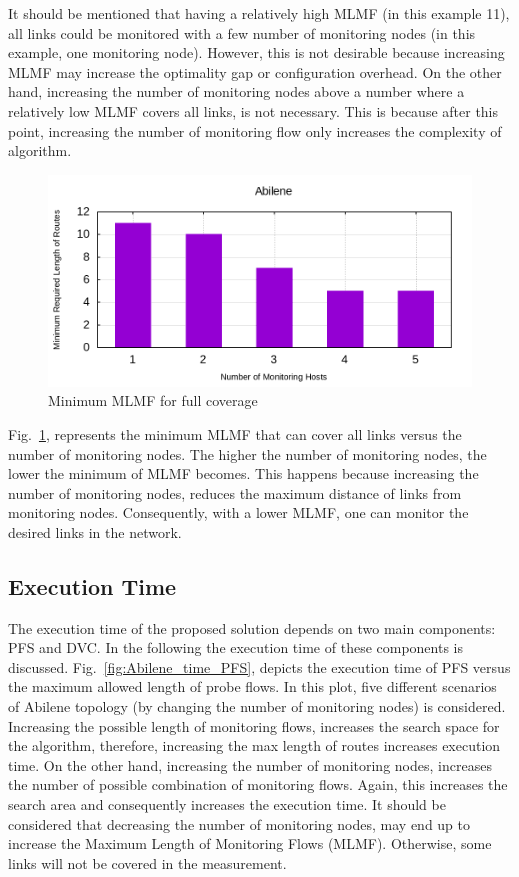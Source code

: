 \documentclass[10pt, journal, letterpaper]{IEEEtran}
\begin{document}
It should be mentioned that having a relatively high MLMF (in this example 11), all links could be monitored with a few number of monitoring nodes (in this example, one monitoring node). However, this is not desirable because increasing MLMF may increase the optimality gap or configuration overhead. On the other hand, increasing the number of monitoring nodes above a number where a relatively low MLMF covers all links, is not necessary. This is because after this point, increasing the number of monitoring flow only increases the complexity of algorithm. 
\begin{figure}
    \centering
    \includegraphics[width=0.8\columnwidth]{img/eval_Abilene_bar_min_length_of_routes_with_different_monitoring_nodes.png}
    \caption{Minimum MLMF for full coverage}
    \label{fig:bar_min_MLMF_full_cover}
\end{figure}
Fig.~\ref{fig:bar_min_MLMF_full_cover}, represents the minimum MLMF that can cover all links versus the number of monitoring nodes. The higher the number of monitoring nodes, the lower the minimum of MLMF becomes. This happens because increasing the number of monitoring nodes, reduces the maximum distance of links from monitoring nodes. Consequently, with a lower MLMF, one can monitor the desired links in the network. %

\subsection{Execution Time}\label{subsec:eval_exec_time}
The execution time of the proposed solution depends on two main components: PFS and DVC. In the following the execution time of these components is discussed. Fig.~\ref{fig:Abilene_time_PFS}, depicts the execution time of PFS versus the maximum allowed length of probe flows. In this plot, five different scenarios of Abilene topology (by changing the number of monitoring nodes) is considered. Increasing the possible length of monitoring flows, increases the search space for the algorithm, therefore, increasing the max length of routes increases execution time. On the other hand, increasing the number of monitoring nodes, increases the number of possible combination of monitoring flows. Again, this increases the search area and consequently increases the execution time. It should be considered that decreasing the number of monitoring nodes, may end up to increase the Maximum Length of Monitoring Flows (MLMF). Otherwise, some links will not be covered in the measurement.
\end{document}
